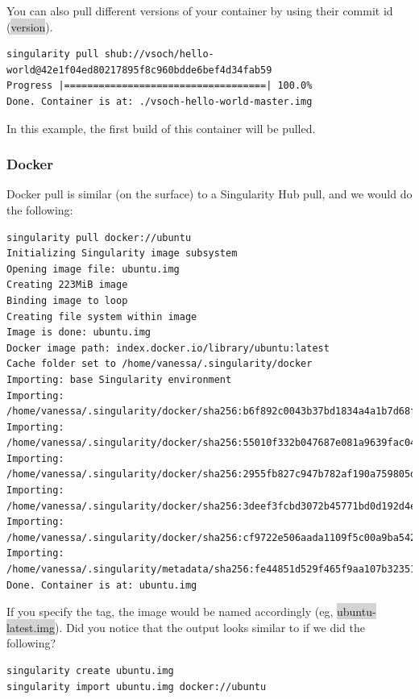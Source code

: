 \documentclass[a4paper]{article}
\newcounter{subsubsubsection}[subsubsection]
\begin{document}
		
		You can also pull different versions of your container by using their commit id (\colorbox{lightgray}{version}).\\[0.1in]
\begin{lstlisting}[frame=single]
singularity pull shub://vsoch/hello-world@42e1f04ed80217895f8c960bdde6bef4d34fab59
Progress |===================================| 100.0%
Done. Container is at: ./vsoch-hello-world-master.img
\end{lstlisting}

In this example, the first build of this container will be pulled.
		
	\subsubsection{Docker}
	Docker pull is similar (on the surface) to a Singularity Hub pull, and we would do the following:
	
\begin{lstlisting}[frame=single]
singularity pull docker://ubuntu
Initializing Singularity image subsystem
Opening image file: ubuntu.img
Creating 223MiB image
Binding image to loop
Creating file system within image
Image is done: ubuntu.img
Docker image path: index.docker.io/library/ubuntu:latest
Cache folder set to /home/vanessa/.singularity/docker
Importing: base Singularity environment
Importing: /home/vanessa/.singularity/docker/sha256:b6f892c0043b37bd1834a4a1b7d68fe6421c6acbc7e7e63a4527e1d379f92c1b.tar.gz
Importing: /home/vanessa/.singularity/docker/sha256:55010f332b047687e081a9639fac04918552c144bc2da4edb3422ce8efcc1fb1.tar.gz
Importing: /home/vanessa/.singularity/docker/sha256:2955fb827c947b782af190a759805d229cfebc75978dba2d01b4a59e6a333845.tar.gz
Importing: /home/vanessa/.singularity/docker/sha256:3deef3fcbd3072b45771bd0d192d4e5ff2b7310b99ea92bce062e01097953505.tar.gz
Importing: /home/vanessa/.singularity/docker/sha256:cf9722e506aada1109f5c00a9ba542a81c9e109606c01c81f5991b1f93de7b66.tar.gz
Importing: /home/vanessa/.singularity/metadata/sha256:fe44851d529f465f9aa107b32351c8a0a722fc0619a2a7c22b058084fac068a4.tar.gz
Done. Container is at: ubuntu.img
\end{lstlisting}

If you specify the tag, the image would be named accordingly (eg,  \colorbox{lightgray}{ubuntu-latest.img}). Did you notice that the output looks similar to if we did the following?

\begin{lstlisting}[frame=single]
singularity create ubuntu.img
singularity import ubuntu.img docker://ubuntu
\end{lstlisting}
\end{document}
